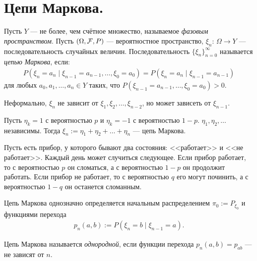 \documentclass[../main.tex]{subfiles}
\begin{document}
\newpage
\section{Цепи Маркова.}

\begin{df}
	Пусть $ Y $ --- не более, чем счётное множество, называемое \textit{фазовым пространством}. Пусть $ (\Omega,\mathcal F,P) $ --- вероятностное пространство, $ \xi_n \colon\, \Omega \to Y $ --- последовательность случайных величин. Последовательность $ \{\xi_n\}_{n = 0}^{\infty} $ называется \textit{цепью Маркова}, если:
 \begin{align*}
  P(\xi_n = a_n \mid \xi_{n-1} = a_{n-1}, \ldots, \xi_0 = a_0) = P(\xi_n = a_n \mid \xi_{n-1} = a_{n-1})
 \end{align*} для любых $ a_0, a_1, \ldots, a_n \in Y $ таких, что $ P(\xi_{n-1} = a_{n-1}, \ldots, \xi_0 = a_0) > 0 $.

 Неформально, $ \xi_n $ не зависит от $ \xi_1, \xi_2, \ldots, \xi_{n-2} $, но может зависеть от $ \xi_{n-1} $.
\end{df}
\begin{exmpl}
 \label{exmpl:random_walk_z}
 Пусть $ \eta_k = 1 $ с вероятностью $ p $ и $ \eta_k = -1 $  с вероятностью $ 1-p $. $ \eta_1, \eta_2, \ldots $  независимы. Тогда $ \xi_n := \eta_1 + \eta_2 + \ldots + \eta_n $ --- цепь Маркова.
\end{exmpl}
\begin{exmpl}
 \label{exmpl:random_walk_machine}
 Пусть есть прибор, у которого бывают два состояния: <<работает>> и <<не работает>>. Каждый день может случиться следующее. Если прибор работает, то с вероятностью $ p $ он сломаться, а с вероятностью $ 1-p $ он продолжит работать. Если прибор не работает, то с вероятностью $ q $ его могут починить, а с вероятностью $ 1-q $ он останется сломанным.
\end{exmpl}
\begin{remrk}
 Цепь Маркова однозначно определяется начальным распределением $ \pi_0 := P_{\xi_0} $ и функциями перехода
 \begin{align*}
  p_n(a,b) := P(\xi_n = b \mid \xi_{n-1} = a).
 \end{align*}
\end{remrk}

\begin{df}
 Цепь Маркова называется \textit{однородной}, если функции перехода $ p_n(a,b) = p_{ab} $ --- не зависят от $ n $.
\end{df}
\end{document}
